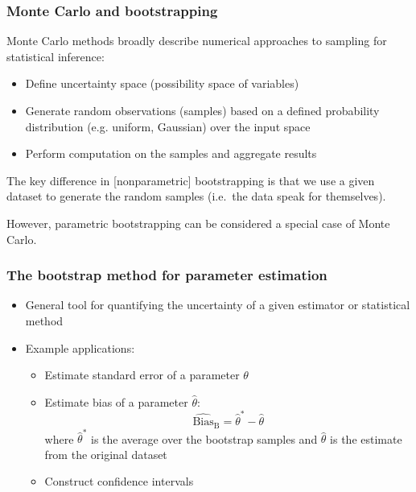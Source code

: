 \documentclass[smaller]{beamer}
\newcommand{\?}{\stackrel{?}{=}}
\newcommand{\rd}{\color{red}}
\begin{document}
\begin{frame}
  \frametitle{Monte Carlo and bootstrapping}
  \pause

  Monte Carlo methods broadly describe numerical approaches to sampling for statistical inference:\pause
  \begin{itemize}[<+->]
  \item Define uncertainty space (possibility space of variables)
  \item Generate random observations (samples) based on a defined probability distribution (e.g. uniform, Gaussian) over the input space
  \item Perform computation on the samples and aggregate results
  \end{itemize}
  \pause

  \bigskip
  
 {\rd The key difference in [nonparametric] bootstrapping is that we use a given dataset to generate the random samples (i.e.\ the data speak for themselves).} \\ \pause

  \bigskip

  However, parametric bootstrapping can be considered a special case of Monte Carlo.
  
\end{frame}

 \begin{frame}
  \frametitle{The bootstrap method for parameter estimation}
  \pause

  \begin{itemize}[<+->]
  \item General tool for quantifying the uncertainty of a given estimator or statistical method
  \item Example applications:
    \begin{itemize}[<+->]
    \item Estimate standard error of a parameter $\theta$
    \item Estimate bias of a parameter $\hat\theta$: \pause
      \begin{equation}
         \widehat{\text{Bias}}_{\text{B}} = \hat\theta^* - \hat\theta
      \end{equation}
    \pause
    where $\hat\theta^*$ is the average over the bootstrap samples and $\hat\theta$ is the estimate from the original dataset
    \item Construct confidence intervals 
    \end{itemize}
  \end{itemize}
\end{frame}
\end{document}
